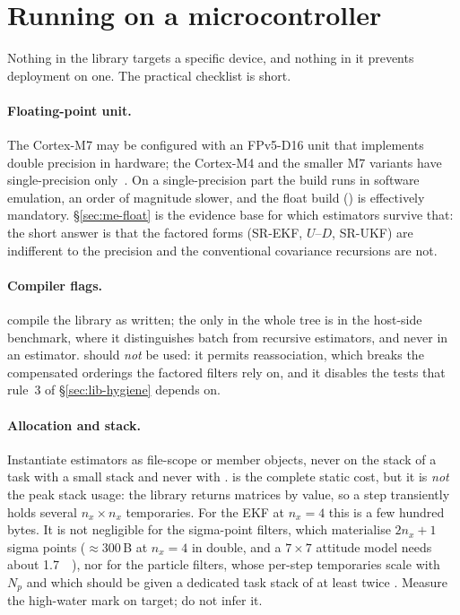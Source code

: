 \section{Running on a microcontroller}
\label{sec:lib-mcu}

Nothing in the library targets a specific device, and nothing in it prevents deployment on one. The
practical checklist is short.

\paragraph{Floating-point unit.} The Cortex-M7 may be configured with an FPv5-D16 unit that
implements double precision in hardware; the Cortex-M4 and the smaller M7 variants have
single-precision only~\cite{arm2021cortexm7}. On a single-precision part the  build
runs in software emulation, an order of magnitude slower, and the float build
() is effectively mandatory. \S\ref{sec:me-float} is the evidence base for
which estimators survive that: the short answer is that the factored forms (SR-EKF, $U$--$D$,
SR-UKF) are indifferent to the precision and the conventional covariance recursions are not.

\paragraph{Compiler flags.}  compile the library as written; the
only  in the whole tree is in the host-side benchmark, where it distinguishes
batch from recursive estimators, and never in an estimator.  should \emph{not} be
used: it permits reassociation, which breaks the compensated orderings the factored filters rely
on, and it disables the  tests that rule~3 of \S\ref{sec:lib-hygiene} depends on.

\paragraph{Allocation and stack.} Instantiate estimators as file-scope or member objects, never on
the stack of a task with a small stack and never with .  is the
complete static cost, but it is \emph{not} the peak stack usage: the library returns matrices by
value, so a step transiently holds several $n_x\times n_x$ temporaries. For the EKF at $n_x=4$
this is a few hundred bytes. It is not negligible for the sigma-point filters, which materialise
$2n_x+1$ sigma points ($\approx 300$\,B at $n_x=4$ in double, and a $7\times7$ attitude model needs
about \SI{1.7}{\kilo\byte}), nor for the particle filters, whose per-step temporaries scale with
$N_p$ and which should be given a dedicated task stack of at least twice .
Measure the high-water mark on target; do not infer it.


